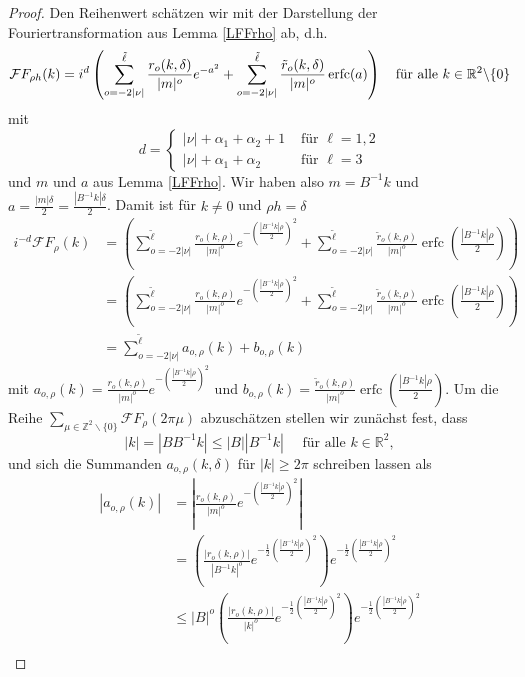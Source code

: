 \documentclass[12pt,a4paper]{scrartcl}
\numberwithin{equation}{section}
\newcommand{\R}{\mathbb{R}} %
\newcommand{\Z}{\mathbb{Z}} %
\newcommand{\F}{\mathcal{F}} %
\newcommand{\erfc}{\operatorname{erfc}}
\newcommand{\fa}{\text{\quad für alle }}
\begin{document}
\begin{proof}
Den Reihenwert schätzen wir mit der Darstellung der Fouriertransformation aus Lemma \ref{LFFrho} ab, d.h. 
\begin{align*}
\F F_{\rho h}(k) = i^{d} \left(\sum_{o=-2|\nu|}^{\tilde \ell} \frac{r_o(k,\delta)}{|m|^o}e^{-a^2} + \sum_{o=-2|\nu|}^{\tilde \ell} \frac{\tilde r_o(k,\delta)}{|m|^o}\erfc(a) \right) \fa k \in \R^2 \backslash\{0\}
\end{align*}
mit \[
d= 
\begin{cases} 
|\nu|+\alpha_1+\alpha_2+1 &\text{ für } \ell=1,2\\
|\nu|+\alpha_1+\alpha_2 &\text{ für } \ell=3
\end{cases} 
\]
und $m$ und $a$ aus Lemma \ref{LFFrho}. Wir haben also $m= B^{-1} k $ und $a= \frac{|m| \delta}{2}= \frac{|B^{-1}k|\delta}{2}$. 
Damit ist für $k \neq 0$ und $\rho h = \delta$
\begin{align*}
i^{-d}\F F_{\rho}(k) 
&= \left(\sum_{o=-2|\nu|}^{\tilde \ell} \frac{r_o(k,\rho)}{|m|^o}e^{-\left(\frac{|B^{-1}k|\rho}{2}\right)^2} + \sum_{o=-2|\nu|}^{\tilde \ell} \frac{\tilde r_o(k,\rho)}{|m|^o}\erfc \left(\frac{|B^{-1}k| \rho}{2} \right) \right) \\
&= \left(\sum_{o=-2|\nu|}^{\tilde \ell} \frac{r_o(k,\rho)}{|m|^o}e^{-\left(\frac{|B^{-1}k|\rho}{2}\right)^2} + \sum_{o=-2|\nu|}^{\tilde \ell} \frac{\tilde r_o(k,\rho)}{|m|^o}\erfc \left(\frac{|B^{-1}k| \rho}{2} \right) \right) \\
&= \sum_{o=-2|\nu|}^{\tilde \ell} a_{o,\rho}(k) + b_{o,\rho}(k) 
\end{align*}
mit $a_{o,\rho}(k)= \frac{r_o(k,\rho)}{|m|^o}e^{-\left(\frac{|B^{-1}k|\rho}{2}\right)^2}$ und $b_{o,\rho}(k)=\frac{\tilde r_o(k,\rho)}{|m|^o}\erfc \left(\frac{|B^{-1}k| \rho}{2} \right)$. 
Um die Reihe $\sum_{\mu \in \Z^2 \backslash \{0\} } \F F_\rho(2 \pi \mu)$ abzuschätzen stellen wir zunächst fest, dass 
\[
|k| = |B B^{-1} k| \leq |B| |B^{-1} k| \quad \text{ für alle }k\in \R^2,
\] und sich die Summanden $a_{o,\rho}(k,\delta)$ für $|k| \geq 2\pi$ schreiben lassen als
\begin{align*}
|a_{o,\rho}(k) |
&= \left|\frac{r_o(k,\rho)}{|m|^o}e^{-\left(\frac{|B^{-1}k|\rho}{2}\right)^2} \right| \\
&= \left(\frac{|r_o(k,\rho)|}{|B^{-1}k|^o}e^{-\frac{1}{2}\left(\frac{|B^{-1}k|\rho}{2}\right)^2}\right)e^{-\frac{1}{2}\left(\frac{|B^{-1}k|\rho}{2}\right)^2}  \\
&\leq |B|^o \left(\frac{|r_o(k,\rho)|}{|k|^o}e^{-\frac{1}{2}\left(\frac{|B^{-1}k|\rho}{2}\right)^2}\right)e^{-\frac{1}{2}\left(\frac{|B^{-1}k|\rho}{2}\right)^2} \\

\end{align*}
\end{proof}
\end{document}
